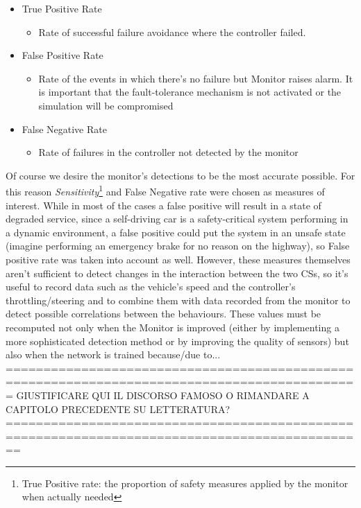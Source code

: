 \begin{itemize}
	\item True Positive Rate
	\begin{itemize}
		\item Rate of successful failure avoidance where the controller failed.
	\end{itemize}
	\item False Positive Rate
	\begin{itemize}
		\item Rate of the events in which there's no failure but Monitor raises alarm. It is important that the fault-tolerance mechanism is not activated or the simulation will be compromised
	\end{itemize}
	\item False Negative Rate
	\begin{itemize}
		\item Rate of failures in the controller not detected by the monitor
	\end{itemize}
\end{itemize}

Of course we desire the monitor's detections to be the most accurate possible. For this reason \textsl{Sensitivity}\footnote{True Positive rate: the proportion of safety measures applied by the monitor when actually needed} and False Negative rate were chosen as measures of interest.\newline
While in most of the cases a false positive will result in a state of degraded service, since a self-driving car is a safety-critical system performing in a dynamic environment, a false positive could put the system in an unsafe state (imagine performing an emergency brake for no reason on the highway), so False positive rate was taken into account as well.\newline
However, these measures themselves aren't sufficient to detect changes in the interaction between the two CSs, so it's useful to record data such as the vehicle's speed and the controller's throttling/steering and to combine them with data recorded from the monitor to detect possible correlations between the behaviours.
These values must be recomputed not only when the Monitor is improved (either by implementing a more sophisticated detection method or by improving the quality of sensors) but also when the network is trained because/due to...
=============================================================================================
GIUSTIFICARE QUI IL DISCORSO FAMOSO O RIMANDARE A CAPITOLO PRECEDENTE SU LETTERATURA?
==============================================================================================

